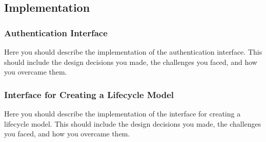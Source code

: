 \subsection{Implementation}
\subsubsection{Authentication Interface}
Here you should describe the implementation of the authentication interface. This should include the design decisions you made, the challenges you faced, and how you overcame them.

\subsubsection{Interface for Creating a Lifecycle Model}
Here you should describe the implementation of the interface for creating a lifecycle model. This should include the design decisions you made, the challenges you faced, and how you overcame them.
